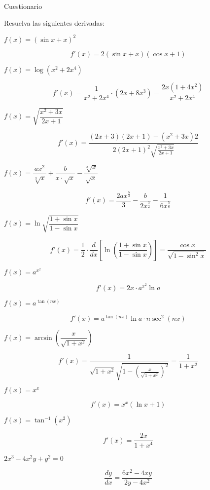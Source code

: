 \documentclass[answers]{exam} %
\begin{document}
\vspace{0.5cm}
\large Cuestionario
\vspace{0.5cm}

Resuelva las siguientes derivadas:
\begin{questions}

    \question $f(x)=(\sin x + x)^2$
    
    \[
    f'(x) = 2(\sin x + x)(\cos x + 1)
    \]

    \question $f(x)=\log(x^2+2x^4)$
    
    \[
    f'(x) = \frac{1}{x^2 + 2x^4} \cdot (2x + 8x^3) = \frac{2x(1 + 4x^2)}{x^2 + 2x^4}
    \]

    \question $f(x)=\sqrt{\dfrac{x^2+3x}{2x+1}}$
    
    \[
    f'(x) = \frac{(2x + 3)(2x + 1) - (x^2 + 3x)2}{2(2x + 1)^2\sqrt{\frac{x^2 + 3x}{2x + 1}}}
    \]

    \question $f(x)=\dfrac{ax^2}{\sqrt[3]{x}}+\dfrac{b}{x\cdot \sqrt{x}}-\dfrac{\sqrt[3]{x}}{\sqrt{x}}$
    
    \[
    f'(x) = \frac{2ax^{\frac{5}{3}}}{3} - \frac{b}{2x^{\frac{3}{2}}} - \frac{1}{6x^{\frac{5}{6}}}
    \]

    \question $f(x)=\ln \sqrt{\dfrac{1+\sin x}{1-\sin x}}$
    
    \[
    f'(x) = \frac{1}{2} \cdot \frac{d}{dx} \left[\ln\left(\frac{1+\sin x}{1-\sin x}\right)\right] = \frac{\cos x}{\sqrt{1-\sin^2 x}}
    \]

    \question $f(x)=a^{x^2}$
    
    \[
    f'(x) = 2x \cdot a^{x^2} \ln a
    \]

    \question $f(x)=a^{\tan (nx)}$
    
    \[
    f'(x) = a^{\tan (nx)} \ln a \cdot n \sec^2(nx)
    \]

    \question $f(x)= \arcsin\left(\dfrac{x}{\sqrt{1+x^2}}\right)$
    
    \[
    f'(x) = \frac{1}{\sqrt{1+x^2} \sqrt{1-\left(\frac{x}{\sqrt{1+x^2}}\right)^2}} = \frac{1}{1+x^2}
    \]

    \question $f(x)=x^x$
    
    \[
    f'(x) = x^x \left(\ln x + 1\right)
    \]

    \question $f(x)=\tan^{-1}(x^2)$
    
    \[
    f'(x) = \frac{2x}{1+x^4}
    \]

    \question $2x^3-4x^2y+y^2=0$
    
    \[
    \frac{dy}{dx} = \frac{6x^2-4xy}{2y-4x^2}
    \]


\end{questions}
\end{document}
